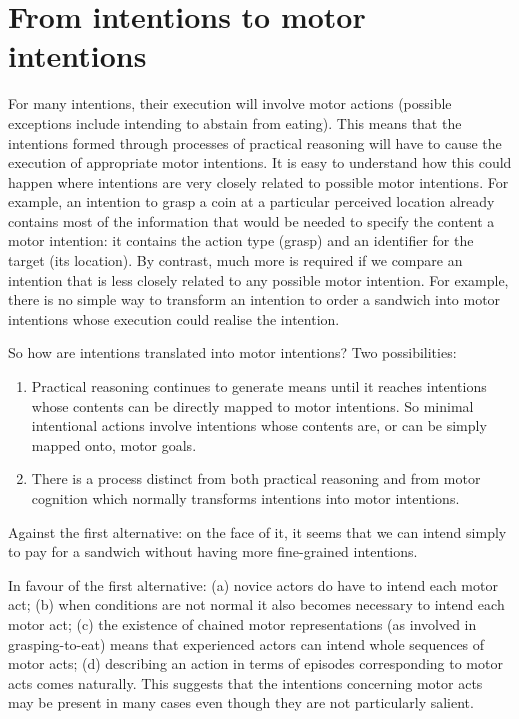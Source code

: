 \documentclass[12pt,a4paper]{extarticle}
\begin{document}
\section{From intentions to motor intentions}
For many intentions, their execution will involve motor actions (possible exceptions include intending to abstain from eating).  
This means that the intentions formed through processes of practical reasoning will have to cause the execution of appropriate motor intentions.
It is easy to understand how this could happen where intentions are very closely related to possible motor intentions.  
For example, an intention to grasp a coin at a particular perceived location already contains most of the information that would be needed to specify the content a motor intention: it contains the action type (grasp) and an identifier for the target (its location).
By contrast, much more is required if we compare an intention that is less closely related to any possible motor intention.
For example, there is no simple way to transform an intention to order a sandwich into motor intentions whose execution could realise the intention.

So how are intentions translated into motor intentions?  
Two possibilities:
\begin{enumerate}
\item Practical reasoning continues to generate means until it reaches intentions whose contents can be directly mapped to motor intentions.  So minimal intentional actions involve intentions whose contents are, or can be simply mapped onto, motor goals.
\item There is a process distinct from both practical reasoning and from motor cognition which normally transforms intentions into motor intentions.
\end{enumerate}
%
Against the first alternative: on the face of it, it seems that we can intend simply to pay for a sandwich without having more fine-grained intentions.

In favour of the first alternative: (a) novice actors do have to intend each motor act; (b) when conditions are not normal it also becomes necessary to intend each motor act; (c) the existence of chained motor representations (as involved in grasping-to-eat) means that experienced actors can intend whole sequences of motor acts; (d) describing an action in terms of episodes corresponding to motor acts comes naturally.  
This suggests that the intentions concerning motor acts may be present in many cases even though they are not particularly salient.
\end{document}
